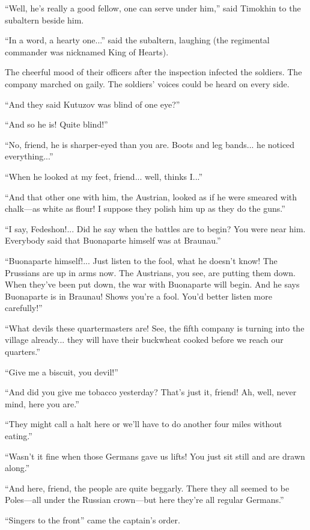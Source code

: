 ``Well, he's really a good fellow, one can serve under him,''
said Timokhin to the subaltern beside him.

``In a word, a hearty one...'' said the subaltern, laughing (the
regimental commander was nicknamed King of Hearts).

The cheerful mood of their officers after the inspection infected
the soldiers. The company marched on gaily. The soldiers' voices
could be heard on every side.

``And they said Kutuzov was blind of one eye?''

``And so he is! Quite blind!''

``No, friend, he is sharper-eyed than you are. Boots and leg
bands... he noticed everything...''

``When he looked at my feet, friend... well, thinks I...''

``And that other one with him, the Austrian, looked as if he were
smeared with chalk---as white as flour! I suppose they polish him
up as they do the guns.''

``I say, Fedeshon!... Did he say when the battles are to begin?
You were near him. Everybody said that Buonaparte himself was at
Braunau.''

``Buonaparte himself!... Just listen to the fool, what he doesn't
know!  The Prussians are up in arms now. The Austrians, you see,
are putting them down. When they've been put down, the war with
Buonaparte will begin. And he says Buonaparte is in Braunau!
Shows you're a fool. You'd better listen more carefully!''

``What devils these quartermasters are! See, the fifth company is
turning into the village already... they will have their
buckwheat cooked before we reach our quarters.''

``Give me a biscuit, you devil!''

``And did you give me tobacco yesterday? That's just it, friend!
Ah, well, never mind, here you are.''

``They might call a halt here or we'll have to do another four
miles without eating.''

``Wasn't it fine when those Germans gave us lifts! You just sit
still and are drawn along.''

``And here, friend, the people are quite beggarly. There they all
seemed to be Poles---all under the Russian crown---but here
they're all regular Germans.''

``Singers to the front'' came the captain's order.

